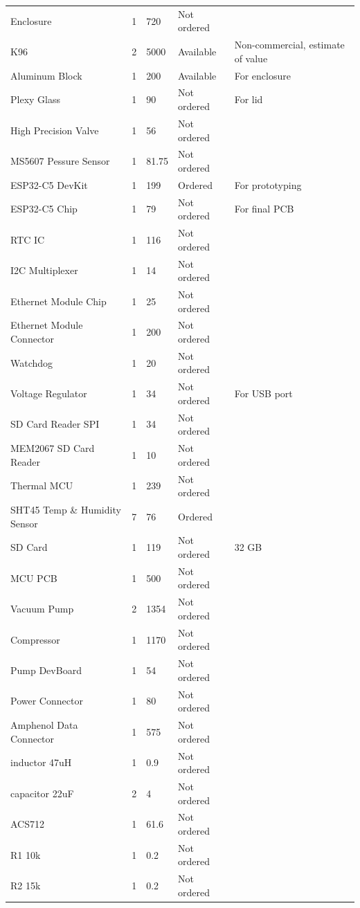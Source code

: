 \begin{longtable}{p{3cm}p{1.7cm}p{1.5cm}p{3cm}p{5cm}}
Enclosure & 1 & 720 & Not ordered &  \\
K96 & 2 & 5000 & Available & Non-commercial, estimate of value\\
Aluminum Block & 1 & 200 & Available & For enclosure \\
Plexy Glass & 1 & 90 & Not ordered & For lid \\
High Precision Valve & 1 & 56 & Not ordered &  \\
MS5607 Pessure Sensor & 1 & 81.75 & Not ordered &  \\
ESP32-C5 DevKit & 1 & 199 & Ordered & For prototyping \\
ESP32-C5 Chip & 1 & 79 & Not ordered & For final PCB \\
RTC IC & 1 & 116 & Not ordered &  \\
I2C Multiplexer & 1 & 14 & Not ordered &  \\
Ethernet Module Chip & 1 & 25 & Not ordered &  \\
Ethernet Module Connector & 1 & 200 & Not ordered &  \\
Watchdog & 1 & 20 & Not ordered &  \\
Voltage Regulator & 1 & 34 & Not ordered & For USB port \\
SD Card Reader SPI & 1 & 34 & Not ordered &  \\
MEM2067 SD Card Reader & 1 & 10 & Not ordered &  \\
Thermal MCU & 1 & 239 & Not ordered &  \\
SHT45 Temp \& Humidity Sensor & 7 & 76 & Ordered &  \\
SD Card & 1 & 119 & Not ordered & 32 GB \\
MCU PCB & 1 & 500 & Not ordered &  \\
Vacuum Pump & 2 & 1354 & Not ordered &  \\
Compressor & 1 & 1170 & Not ordered &  \\
Pump DevBoard & 1 & 54 & Not ordered &  \\
Power Connector & 1 & 80 & Not ordered &  \\
Amphenol Data Connector & 1 & 575 & Not ordered &  \\
inductor 47uH & 1 & 0.9 & Not ordered &  \\
capacitor 22uF & 2 & 4 & Not ordered &  \\
ACS712 & 1 & 61.6 & Not ordered &  \\
R1 10k & 1 & 0.2 & Not ordered &  \\
R2 15k & 1 & 0.2 & Not ordered &  \\

\end{longtable}
